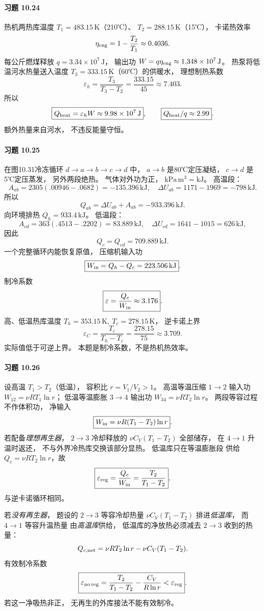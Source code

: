 \paragraph{习题 10.24}
热机两热库温度
\(T_1=483.15\,\mathrm K\)（210℃）、
\(T_2=288.15\,\mathrm K\)（15℃），
卡诺热效率
\[
 \eta_{\rm eng}=1-\frac{T_2}{T_1}
 \approx0.4036.
\]
每公斤燃煤释放
\(q=3.34\times10^7\,\mathrm J\)，
输出功
\(W=q\eta_{\rm eng}\approx1.348\times10^7\,\mathrm J\)。
热泵将低温河水热量送入温度
\(T_3=333.15\,\mathrm K\)（60℃）的供暖水，
理想制热系数
\[
 \varepsilon_h=\frac{T_3}{T_3-T_2}
 =\frac{333.15}{45}\approx7.403.
\]
所以
\[
 \boxed{Q_{\rm heat}=\varepsilon_hW
 \approx9.98\times10^7\,\mathrm J},
 \qquad
 \boxed{Q_{\rm heat}/q\approx2.99}.
\]
额外热量来自河水，
不违反能量守恒。

\paragraph{习题 10.25}
在图10.31冷冻循环
\(d\to a\to b\to c\to d\) 中，
\(a\to b\) 是80℃定压凝结，
\(c\to d\) 是5℃定压蒸发，
另外两段绝热。
气体对外功为正，
\(\mathrm{kPa\,m^3=kJ}\)。
高温段：
\[
 A_{ab}=2305(.00946-.0682)
 =-135.396\,\mathrm{kJ},
\quad
 \Delta U_{ab}=1171-1969=-798\,\mathrm{kJ}.
\]
所以
\[
 \boxed{Q_{ab}=\Delta U_{ab}+A_{ab}
 =-933.396\,\mathrm{kJ}}.
\]
向环境排热
\(\boxed{Q_h=933.4\,\mathrm{kJ}}\)。
低温段：
\[
 A_{cd}=363(.4513-.2202)
 =83.889\,\mathrm{kJ},\quad
 \Delta U_{cd}=1641-1015=626\,\mathrm{kJ},
\]
因此
\[
 \boxed{Q_c=Q_{cd}=709.889\,\mathrm{kJ}}.
\]
一个完整循环内能恢复原值，
压缩机输入功
\[
 \boxed{W_{\rm in}=Q_h-Q_c
 =223.506\,\mathrm{kJ}}.
\]
制冷系数
\[
 \boxed{\varepsilon=\frac{Q_c}{W_{\rm in}}
 \approx3.176}.
\]
高、低温热库温度
\(T_h=353.15\,\mathrm K,\ T_c=278.15\,\mathrm K\)，
逆卡诺上界
\[
 \boxed{\varepsilon_C=\frac{T_c}{T_h-T_c}
 =\frac{278.15}{75}\approx3.709}.
\]
实际值低于可逆上界。
本题是制冷系数，不是热机热效率。

\paragraph{习题 10.26}
设高温 \(T_1>T_2\)（低温），
容积比 \(r=V_1/V_2>1\)。
高温等温压缩 \(1\to2\) 输入功
\(W_{12}=\nu RT_1\ln r\)；
低温等温膨胀 \(3\to4\) 输出功
\(W_{34}=\nu RT_2\ln r\)。
两段等容过程不作体积功，
净输入
\[
 \boxed{W_{\rm in}=\nu R(T_1-T_2)\ln r}.
\]
若配备\emph{理想再生器}，
\(2\to3\) 冷却释放的
\(\nu C_V(T_1-T_2)\) 全部储存，
在 \(4\to1\) 升温时返还，
不与外界冷热库交换该部分显热。
低温库只在等温膨胀段
供给 \(Q_c=\nu RT_2\ln r\)，故
\[
 \boxed{\varepsilon_{\rm reg}
 =\frac{Q_c}{W_{\rm in}}
 =\frac{T_2}{T_1-T_2}},
\]
与逆卡诺循环相同。

若\emph{没有再生器}，
题设的 \(2\to3\) 等容冷却热量
\(\nu C_V(T_1-T_2)\)
排进\emph{低温库}，
而 \(4\to1\) 等容升温热量
由\emph{高温库}供给，
低温库的净放热必须减去
\(2\to3\) 收到的热量：
\[
 Q_{c,\rm net}=
 \nu RT_2\ln r-\nu C_V(T_1-T_2).
\]
有效制冷系数
\[
 \boxed{\varepsilon_{\rm no\,reg}
 =\frac{T_2}{T_1-T_2}
 -\frac{C_V}{R\ln r}
 <\varepsilon_{\rm reg}}.
\]
若这一净吸热非正，
无再生的外库接法不能有效制冷。

